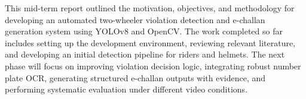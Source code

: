 This mid-term report outlined the motivation, objectives, and methodology for developing an automated two-wheeler violation detection and e-challan generation system using YOLOv8 and OpenCV. The work completed so far includes setting up the development environment, reviewing relevant literature, and developing an initial detection pipeline for riders and helmets. The next phase will focus on improving violation decision logic, integrating robust number plate OCR, generating structured e-challan outputs with evidence, and performing systematic evaluation under different video conditions.
